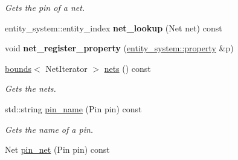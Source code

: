 \begin{DoxyCompactItemize}
\begin{DoxyCompactList}\small\item\em Gets the pin of a net. \end{DoxyCompactList}\item 
\hypertarget{classophidian_1_1timingdriven__placement_1_1timingdriven__placement_acfd1ce9403cffdf426ba8e76db605f68}{entity\-\_\-system\-::entity\-\_\-index {\bfseries net\-\_\-lookup} (Net net) const }\label{classophidian_1_1timingdriven__placement_1_1timingdriven__placement_acfd1ce9403cffdf426ba8e76db605f68}

\item 
\hypertarget{classophidian_1_1timingdriven__placement_1_1timingdriven__placement_ae6f9ec0384d363f9ef4592ca0e572174}{void {\bfseries net\-\_\-register\-\_\-property} (\hyperlink{classophidian_1_1entity__system_1_1property}{entity\-\_\-system\-::property} \&p)}\label{classophidian_1_1timingdriven__placement_1_1timingdriven__placement_ae6f9ec0384d363f9ef4592ca0e572174}

\item 
\hyperlink{structophidian_1_1timingdriven__placement_1_1bounds}{bounds}$<$ Net\-Iterator $>$ \hyperlink{classophidian_1_1timingdriven__placement_1_1timingdriven__placement_a589ff318ee01712569ef982c389b568a}{nets} () const 
\begin{DoxyCompactList}\small\item\em Gets the nets. \end{DoxyCompactList}\item 
\hypertarget{classophidian_1_1timingdriven__placement_1_1timingdriven__placement_a3709b3ff794bb4b1cb0034af51af41c3}{std\-::string \hyperlink{classophidian_1_1timingdriven__placement_1_1timingdriven__placement_a3709b3ff794bb4b1cb0034af51af41c3}{pin\-\_\-name} (Pin pin) const }\label{classophidian_1_1timingdriven__placement_1_1timingdriven__placement_a3709b3ff794bb4b1cb0034af51af41c3}

\begin{DoxyCompactList}\small\item\em Gets the name of a pin. \end{DoxyCompactList}\item 
\hypertarget{classophidian_1_1timingdriven__placement_1_1timingdriven__placement_a6dddbac5a6bc575785ad867948e6fc6f}{Net \hyperlink{classophidian_1_1timingdriven__placement_1_1timingdriven__placement_a6dddbac5a6bc575785ad867948e6fc6f}{pin\-\_\-net} (Pin pin) const }\label{classophidian_1_1timingdriven__placement_1_1timingdriven__placement_a6dddbac5a6bc575785ad867948e6fc6f}


\end{DoxyCompactItemize}
